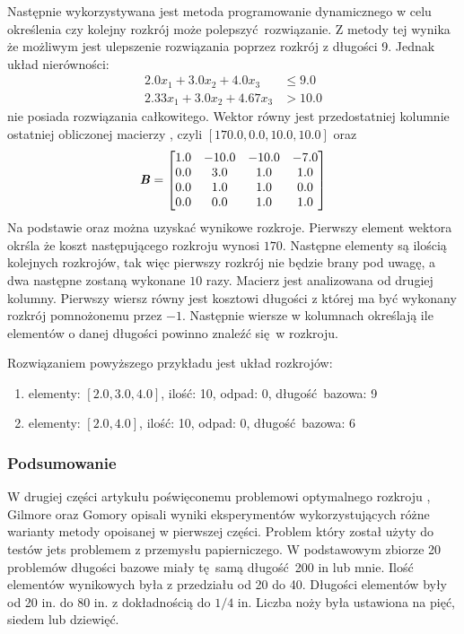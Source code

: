 Następnie wykorzystywana jest metoda programowanie dynamicznego w celu określenia czy kolejny rozkrój może polepszyć rozwiązanie. Z metody tej wynika że możliwym jest ulepszenie rozwiązania poprzez rozkrój z długości 9. Jednak układ nierówności:
\begin{equation*}
  \begin{aligned}
    2.0 x_{1}+ 3.0 x_{2}+ 4.0 x_{3} &\le 9.0 \\
    2.33 x_{1}+ 3.0 x_{2}+ 4.67 x_{3} &> 10.0
  \end{aligned}
\end{equation*}
nie posiada rozwiązania całkowitego. Wektor  równy jest przedostatniej kolumnie ostatniej obliczonej macierzy , czyli $[170.0,0.0,10.0,10.0]$ oraz
\begin{equation*}
  \textbf{\textit{B}} =
  \begin{bmatrix}
    1.0 & -10.0 & -10.0 & -7.0 \\
    0.0 & 3.0 & 1.0 & 1.0 \\
    0.0 & 1.0 & 1.0 & 0.0 \\
    0.0 & 0.0 & 1.0 & 1.0
  \end{bmatrix}
\end{equation*}
Na podstawie  oraz  można uzyskać wynikowe rozkroje. Pierwszy element wektora  okrśla że koszt następującego rozkroju wynosi $170$. Następne elementy są ilością kolejnych rozkrojów, tak więc pierwszy rozkrój nie będzie brany pod uwagę, a dwa następne zostaną wykonane $10$ razy. Macierz  jest analizowana od drugiej kolumny. Pierwszy wiersz równy jest kosztowi długości z której ma być wykonany rozkrój pomnożonemu przez $-1$. Następnie wiersze w kolumnach określają ile elementów o danej długości powinno znaleźć się w rozkroju.

Rozwiązaniem powyższego przykładu jest układ rozkrojów:
\begin{enumerate}
  \item  elementy: $[2.0,3.0,4.0]$, ilość: 10, odpad: 0, długość bazowa: 9
  \item  elementy: $[2.0,4.0]$, ilość: 10, odpad: 0, długość bazowa: 6
\end{enumerate}
\subsubsection{Podsumowanie}
W drugiej części artykułu poświęconemu problemowi optymalnego rozkroju \cite{GilmoreGomoryV2Article}, Gilmore oraz Gomory opisali wyniki eksperymentów wykorzystujących różne warianty metody opoisanej w pierwszej części. Problem który został użyty do testów jets problemem z przemysłu papierniczego. W podstawowym zbiorze 20 problemów długości bazowe miały tę samą długość 200 in lub mnie. Ilość elementów wynikowych była z przedziału od 20 do 40. Długości elementów były od 20 in. do 80 in. z dokładnością do $1/4$ in. Liczba noży była ustawiona na pięć, siedem lub dziewięć.


